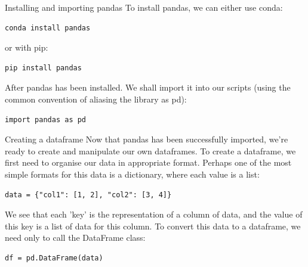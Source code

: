 \documentclass[10pt]{beamer}
\begin{document}
\begin{frame}[label={sec:org664a781},fragile]{Installing and importing pandas}
 To install pandas, we can either use conda:

\begin{verbatim}
conda install pandas
\end{verbatim}

or with pip:

\begin{verbatim}
pip install pandas
\end{verbatim}

After pandas has been installed. We shall import it into our scripts (using the
common convention of aliasing the library as pd):

\begin{verbatim}
import pandas as pd
\end{verbatim}
\end{frame}

\begin{frame}[label={sec:org969d7a0},fragile]{Creating a dataframe}
 Now that pandas has been successfully imported, we're ready to create and
manipulate our own dataframes. To create a dataframe, we first need to organise
our data in appropriate format. Perhaps one of the most simple formats for this
data is a dictionary, where each value is a list:

\begin{verbatim}
data = {"col1": [1, 2], "col2": [3, 4]}
\end{verbatim}

We see that each 'key' is the representation of a column of data, and the value
of this key is a list of data for this column. To convert this data to a
dataframe, we need only to call the DataFrame class:

\begin{verbatim}
df = pd.DataFrame(data)
\end{verbatim}
\end{frame}
\end{document}
